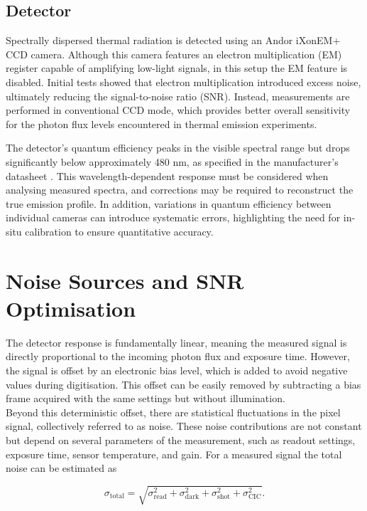 \documentclass[
	parskip=half,
	a4paper,
]{scrarticle}
\begin{document}
\subsection{Detector}
Spectrally dispersed thermal radiation is detected using an Andor iXonEM+ CCD camera. Although this camera features an electron multiplication (EM) register capable of amplifying low-light signals, in this setup the EM feature is disabled. Initial tests showed that electron multiplication introduced excess noise, ultimately reducing the signal-to-noise ratio (SNR). Instead, measurements are performed in conventional CCD mode, which provides better overall sensitivity for the photon flux levels encountered in thermal emission experiments.

The detector's quantum efficiency peaks in the visible spectral range but drops significantly below approximately 480 nm, as specified in the manufacturer's datasheet \autocite{andor_ixonem_nodate}. This wavelength-dependent response must be considered when analysing measured spectra, and corrections may be required to reconstruct the true emission profile. In addition, variations in quantum efficiency between individual cameras can introduce systematic errors, highlighting the need for in-situ calibration to ensure quantitative accuracy.


\section{Noise Sources and SNR Optimisation}

The detector response is fundamentally linear, meaning the measured signal is directly proportional to the incoming photon flux and exposure time. However, the signal is offset by an electronic bias level, which is added to avoid negative values during digitisation. This offset can be easily removed by subtracting a bias frame acquired with the same settings but without illumination.\\
Beyond this deterministic offset, there are statistical fluctuations in the pixel signal, collectively referred to as noise. These noise contributions are not constant but depend on several parameters of the measurement, such as readout settings, exposure time, sensor temperature, and gain. For a measured signal the total noise can be estimated as

\begin{equation}
    \sigma_{\text{total}} = \sqrt{\sigma_{\text{read}}^2 + \sigma_{\text{dark}}^2 + \sigma_{\text{shot}}^2 + \sigma_{\text{CIC}}^2}.
\end{equation}
\end{document}
